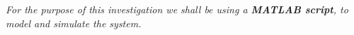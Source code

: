 
    \textit{For the purpose of this investigation we shall be using a \textbf{MATLAB script}, to model and simulate the system.}
        
        


